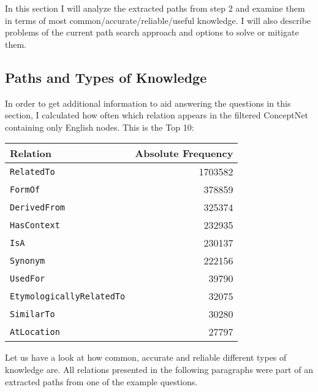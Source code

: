 \documentclass{article}
\begin{document}
In this section I will analyze the extracted paths from step 2 and
examine them in terms of most common/accurate/reliable/useful
knowledge.  I will also describe problems of the current path search
approach and options to solve or mitigate them.

\subsection*{Paths and Types of Knowledge}
\label{sec:which-types-knowl}


In order to get additional information to aid answering the questions
in this section, I calculated how often which relation appears in the
filtered ConceptNet containing only English nodes. This is the Top 10:

\begin{table}[h]
  \center
  \begin{tabular}[h]{lr}
    \hline
    \textbf{Relation} & \textbf{Absolute Frequency} \\
    \hline
\texttt{RelatedTo}        &            1703582 \\
\texttt{FormOf}               &         378859 \\
\texttt{DerivedFrom}         &          325374 \\
\texttt{HasContext}          &          232935 \\
\texttt{IsA}                &           230137 \\
\texttt{Synonym}            &           222156 \\
\texttt{UsedFor}            &            39790 \\
\texttt{EtymologicallyRelatedTo}   &     32075 \\
\texttt{SimilarTo}               &       30280 \\
    \texttt{AtLocation}             &        27797 \\
    \hline
  \end{tabular}
\end{table}

Let us have a look at how common, accurate and reliable different types
of knowledge are. All relations presented in the following paragraphs
were part of an extracted paths from one of the example questions.
\end{document}
